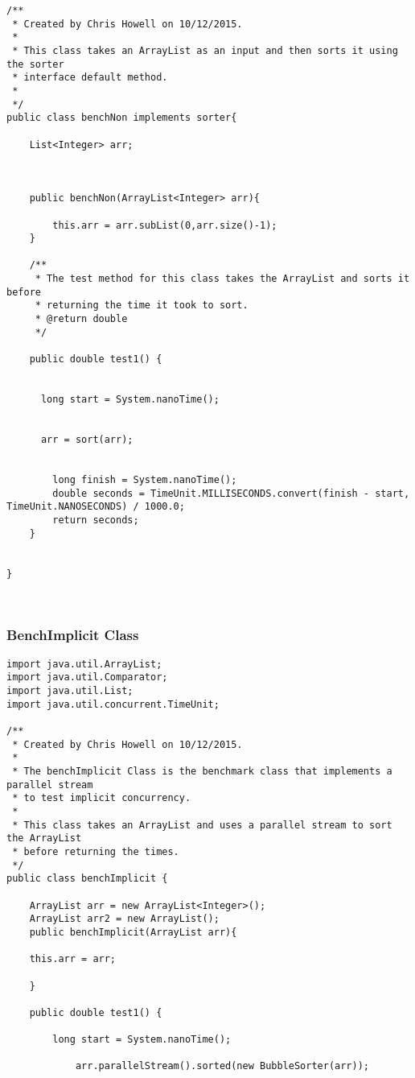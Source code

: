 \documentclass[11pt]{article}  %
\theoremstyle{definition}
\theoremstyle{remark}
\begin{document}
\begin{appendices}
\begin{lstlisting}
/**
 * Created by Chris Howell on 10/12/2015.
 *
 * This class takes an ArrayList as an input and then sorts it using the sorter
 * interface default method.
 *
 */
public class benchNon implements sorter{

    List<Integer> arr;



    public benchNon(ArrayList<Integer> arr){

        this.arr = arr.subList(0,arr.size()-1);
    }

    /**
     * The test method for this class takes the ArrayList and sorts it before
     * returning the time it took to sort.
     * @return double
     */

    public double test1() {


      long start = System.nanoTime();


      arr = sort(arr);


        long finish = System.nanoTime();
        double seconds = TimeUnit.MILLISECONDS.convert(finish - start, TimeUnit.NANOSECONDS) / 1000.0;
        return seconds;
    }


}



\end{lstlisting}
\newpage
\subsubsection{BenchImplicit Class}\label{3} 
 \begin{lstlisting}
import java.util.ArrayList;
import java.util.Comparator;
import java.util.List;
import java.util.concurrent.TimeUnit;

/**
 * Created by Chris Howell on 10/12/2015.
 *
 * The benchImplicit Class is the benchmark class that implements a parallel stream
 * to test implicit concurrency.
 *
 * This class takes an ArrayList and uses a parallel stream to sort the ArrayList
 * before returning the times.
 */
public class benchImplicit {

    ArrayList arr = new ArrayList<Integer>();
    ArrayList arr2 = new ArrayList();
    public benchImplicit(ArrayList arr){

    this.arr = arr;

    }

    public double test1() {

        long start = System.nanoTime();

            arr.parallelStream().sorted(new BubbleSorter(arr));



\end{lstlisting}
\end{appendices}
\end{document}
